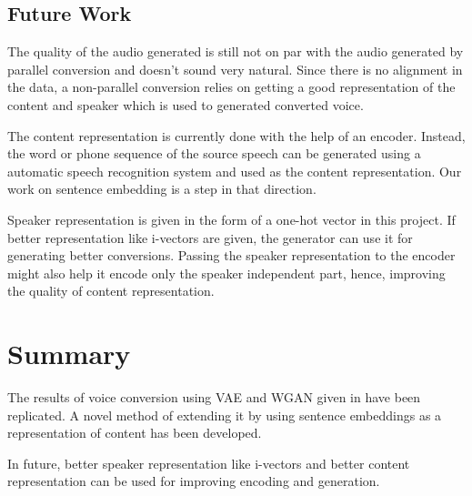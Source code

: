 \documentclass[letterpaper]{article}
\begin{document}
\subsection{Future Work}

The quality of the audio generated is still not on par with the audio generated by parallel conversion and doesn't sound very natural. Since there is no alignment in the data, a non-parallel conversion relies on getting a good representation of the content and speaker which is used to generated converted voice.

The content representation is currently done with the help of an encoder. Instead, the word or phone sequence of the source speech can be generated using a automatic speech recognition system and used as the content representation. Our work on sentence embedding is a step in that direction.

Speaker representation is given in the form of a one-hot vector in this project. If better representation like i-vectors are given, the generator can use it for generating better conversions. Passing the speaker representation to the encoder might also help it encode only the speaker independent part, hence, improving the quality of content representation.

\section{Summary}

The results of voice conversion using VAE and WGAN given in \cite{vawgan} have been replicated. A novel method of extending it by using sentence embeddings as a representation of content has been developed.

In future, better speaker representation like i-vectors and better content representation can be used for improving encoding and generation.



\end{document}
